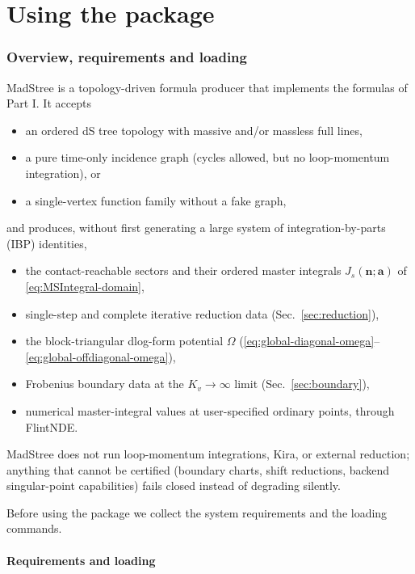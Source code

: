 \documentclass[11pt,a4paper]{article}
\begin{document}
\part{Using the package}

\section{Overview, requirements and loading}
\label{sec:overview}

MadStree is a topology-driven formula producer that implements the formulas of Part I. It accepts
\begin{itemize}
  \item an ordered dS tree topology with massive and/or massless full lines,
  \item a pure time-only incidence graph (cycles allowed, but no loop-momentum integration), or
  \item a single-vertex function family without a fake graph,
\end{itemize}
and produces, without first generating a large system of integration-by-parts (IBP) identities,
\begin{itemize}
  \item the contact-reachable sectors and their ordered master integrals
        $J_s(\bm n;\bm a)$ of \eqref{eq:MSIntegral-domain},
  \item single-step and complete iterative reduction data (Sec.~\ref{sec:reduction}),
  \item the block-triangular dlog-form potential $\Omega$
        (\eqref{eq:global-diagonal-omega}--\eqref{eq:global-offdiagonal-omega}),
  \item Frobenius boundary data at the $K_v\to\infty$ limit (Sec.~\ref{sec:boundary}),
  \item numerical master-integral values at user-specified ordinary points, through FlintNDE.
\end{itemize}
MadStree does not run loop-momentum integrations, Kira, or external reduction; anything that cannot
be certified (boundary charts, shift reductions, backend singular-point capabilities) fails closed
instead of degrading silently.

Before using the package we collect the system requirements and the loading commands.

\subsection{Requirements and loading}
\label{sec:loading}
\end{document}

